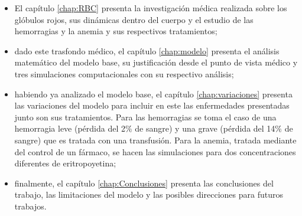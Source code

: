 \begin{itemize}
    \item El capítulo \ref{chap:RBC} presenta la investigación médica realizada sobre los glóbulos rojos, sus dinámicas dentro del cuerpo y el estudio de las hemorragias y la anemia y sus respectivos tratamientos;
    \item dado este trasfondo médico, el capítulo \ref{chap:modelo} presenta el análisis matemático del modelo base, su justificación desde el punto de vista médico y tres simulaciones computacionales con su respectivo análisis;
    \item habiendo ya analizado el modelo base, el capítulo \ref{chap:variaciones} presenta las variaciones del modelo para incluir en este las enfermedades presentadas junto son sus tratamientos. Para las hemorragias se toma el caso de una hemorragia leve (pérdida del 2$\%$ de sangre) y una grave (pérdida del 14$\%$ de sangre) que es tratada con una transfusión. Para la anemia, tratada mediante del control de un fármaco, se hacen las simulaciones para dos concentraciones diferentes de eritropoyetina;
    \item finalmente, el capítulo \ref{chap:Conclusiones} presenta las conclusiones del trabajo, las limitaciones del modelo y las posibles direcciones para futuros trabajos.
\end{itemize}